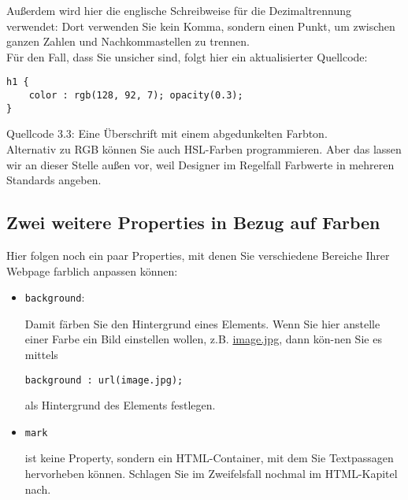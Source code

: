 Außerdem wird hier die englische Schreibweise für die Dezimaltrennung verwendet: Dort verwenden Sie kein Komma, sondern einen Punkt, um zwischen ganzen Zahlen und \glqq{}Nachkommastellen\grqq{} zu trennen.\\

Für den Fall, dass Sie unsicher sind, folgt hier ein aktualisierter Quellcode:
\begin{verbatim}
h1 {
	color : rgb(128, 92, 7); opacity(0.3);
}
\end{verbatim}
Quellcode 3.3: Eine Überschrift mit einem abgedunkelten Farbton.\\

Alternativ zu RGB können Sie auch HSL-Farben programmieren. Aber das lassen wir an dieser Stelle außen vor, weil Designer im Regelfall Farbwerte in mehreren Standards angeben.

\subsection{Zwei weitere Properties in Bezug auf Farben}

Hier folgen noch ein paar Properties, mit denen Sie verschiedene Bereiche Ihrer Webpage farblich anpassen können:

\begin{itemize}
	\item \verb|background|: 
	
	Damit färben Sie den Hintergrund eines Elements. Wenn Sie hier anstelle einer Farbe ein Bild einstellen wollen, z.B. \url{image.jpg}, dann kön-nen Sie es mittels
	
	\verb|background : url(image.jpg); |
	
	als Hintergrund des Elements festlegen.
	
	\item \verb|mark|
	
	ist keine Property, sondern ein HTML-Container, mit dem Sie Textpassagen hervorheben können. Schlagen Sie im Zweifelsfall nochmal im HTML-Kapitel nach.
\end{itemize}

